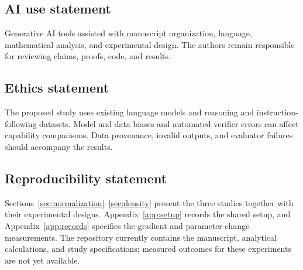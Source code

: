 \subsection*{AI use statement}
Generative AI tools assisted with manuscript organization, language,
mathematical analysis, and experimental design. The authors remain
responsible for reviewing claims, proofs, code, and results.

\subsection*{Ethics statement}
The proposed study uses existing language models and reasoning and
instruction-following datasets. Model and data biases and automated
verifier errors can affect capability comparisons. Data provenance,
invalid outputs, and evaluator failures should accompany the results.

\subsection*{Reproducibility statement}
Sections~\ref{sec:normalization}--\ref{sec:density} present the three
studies together with their experimental designs.
Appendix~\ref{app:setup} records the shared setup, and
Appendix~\ref{app:records} specifies the gradient and parameter-change
measurements. The repository currently contains the manuscript,
analytical calculations, and study specifications; measured outcomes
for these experiments are not yet available.
